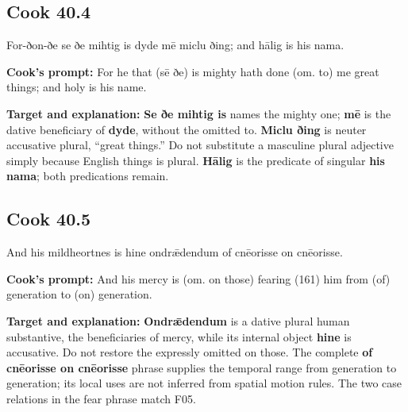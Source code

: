 \par\begin{minipage}{\linewidth}\raggedright
\subsection*{Cook 40.4}

For-ðon-ðe se ðe mihtig is dyde mē miclu ðing; and hālig is his nama.

\textbf{Cook's prompt:} For he that (sē ðe) is mighty hath done (om. to) me great things; and holy is his name.

\textbf{Target and explanation:} \textbf{Se ðe mihtig is} names the mighty one; \textbf{mē} is the dative beneficiary of \textbf{dyde}, without the omitted to. \textbf{Miclu ðing} is neuter accusative plural, “great things.” Do not substitute a masculine plural adjective simply because English things is plural. \textbf{Hālig} is the predicate of singular \textbf{his nama}; both predications remain.

\end{minipage}\par\addvspace{4pt}

\par\begin{minipage}{\linewidth}\raggedright
\subsection*{Cook 40.5}

And his mildheortnes is hine ondrǣdendum of cnēorisse on cnēorisse.

\textbf{Cook's prompt:} And his mercy is (om. on those) fearing (161) him from (of) generation to (on) generation.

\textbf{Target and explanation:} \textbf{Ondrǣdendum} is a dative plural human substantive, the beneficiaries of mercy, while its internal object \textbf{hine} is accusative. Do not restore the expressly omitted on those. The complete \textbf{of cnēorisse on cnēorisse} phrase supplies the temporal range from generation to generation; its local uses are not inferred from spatial motion rules. The two case relations in the fear phrase match F05.

\end{minipage}\par\addvspace{4pt}

